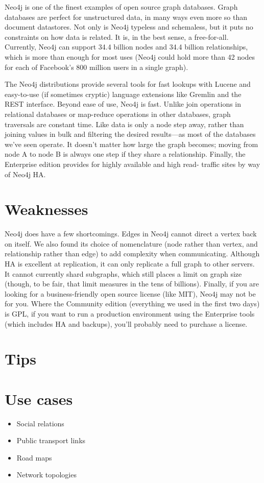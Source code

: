 Neo4j is one of the finest examples of open source graph databases. Graph databases are perfect for unstructured data, in many ways even more so than document datastores. Not only is Neo4j typeless and schemaless, but it puts no constraints on how data is related. It is, in the best sense, a free-for-all. Currently, Neo4j can support 34.4 billion nodes and 34.4 billion relationships, which is more than enough for most uses (Neo4j could hold more than 42 nodes for each of Facebook’s 800 million users in a single graph).

The Neo4j distributions provide several tools for fast lookups with Lucene and easy-to-use (if sometimes cryptic) language extensions like Gremlin and the REST interface. Beyond ease of use, Neo4j is fast. Unlike join operations in relational databases or map-reduce operations in other databases, graph traversals are constant time. Like data is only a node step away, rather than joining values in bulk and filtering the desired results—as most of the databases we’ve seen operate. It doesn’t matter how large the graph becomes; moving from node A to node B is always one step if they share a relationship. Finally, the Enterprise edition provides for highly available and high read- traffic sites by way of Neo4j HA.\cite{seven_databases}

\section{Weaknesses}

Neo4j does have a few shortcomings. Edges in Neo4j cannot direct a vertex back on itself. We also found its choice of nomenclature (node rather than vertex, and relationship rather than edge) to add complexity when communicating. Although HA is excellent at replication, it can only replicate a full graph to other servers. It cannot currently shard subgraphs, which still places a limit on graph size (though, to be fair, that limit measures in the tens of billions). Finally, if you are looking for a business-friendly open source license (like MIT), Neo4j may not be for you. Where the Community edition (everything we used in the first two days) is GPL, if you want to run a production environment using the Enterprise tools (which includes HA and backups), you’ll probably need to purchase a license.\cite{seven_databases}

\section{Tips}

\section{Use cases}

\begin{itemize}
  \item Social relations
  \item Public transport links
  \item Road maps
  \item Network topologies
\end{itemize}